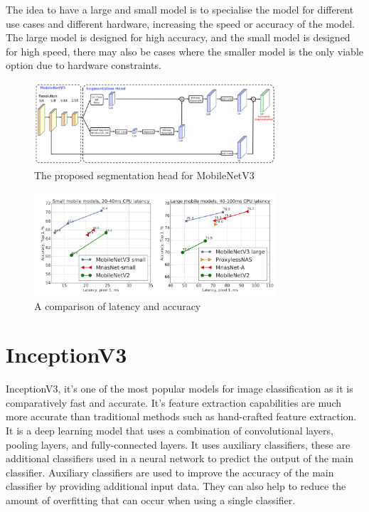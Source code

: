 \documentclass[]{final_report}
\begin{document}
The idea to have a large and small model is to specialise the model for different use cases and different hardware, increasing the speed or accuracy of the model.
The large model is designed for high accuracy, and the small model is designed for high speed, there may also be cases where the smaller model is the only viable option due to hardware constraints.

\begin{figure}[ht!]
  \centering
  \includegraphics[width=0.8\textwidth]{images/MobileNetv3-structure.png}
  \caption{The proposed segmentation head for MobileNetV3\cite{DBLP:journals/corr/abs-1905-02244}}
  \label{fig:mobilenetv3-segmentation}
\end{figure}

\begin{figure}[ht!]
  \centering
  \includegraphics[width=0.8\textwidth]{images/mobilenet-comparison.png}
  \caption{A comparison of latency and accuracy\cite{DBLP:journals/corr/abs-1905-02244}}
  \label{fig:mobilenetv3-comparison}
\end{figure}

\section{InceptionV3}
InceptionV3\cite{DBLP:journals/corr/SzegedyVISW15}, it's one of the most popular models for image classification as it is comparatively fast and accurate.
It's feature extraction capabilities are much more accurate than traditional methods such as hand-crafted feature extraction.
It is a deep learning model that uses a combination of convolutional layers, pooling layers, and fully-connected layers.
It uses auxiliary classifiers, these are additional classifiers used in a neural network to predict the output of the main classifier. Auxiliary classifiers are used to improve the accuracy of the main classifier by providing additional input data.
They can also help to reduce the amount of overfitting that can occur when using a single classifier.
\end{document}
